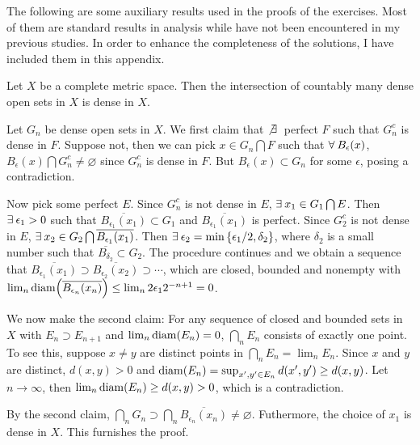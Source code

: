 The following are some auxiliary results used in the proofs 
of the exercises. Most of them are standard results in 
analysis while have not been encountered in my previous 
studies. In order to enhance the completeness of the 
solutions, I have included them in this appendix.
\begin{theorem}
    Let $X$ be a complete metric space. Then the 
    intersection of countably many dense open sets in $X$ 
    is dense in $X$.
\end{theorem}
\begin{pf}
    Let $G_n$ be dense open sets in $X$. We first claim 
    that $\not\exists\:$ perfect $F$ such that $G_n^c$ is 
    dense in $F$. Suppose not, then we can pick $x\in 
    G_n\bigcap F$ such that $\forall\: B_\epsilon(x)$, 
    $B_\epsilon(x)\bigcap G_n^c\neq\varnothing$ since 
    $G_n^c$ is dense in $F$. But $B_\epsilon(x)\subset
    G_n$ for some $\epsilon$, posing a contradiction.

    Now pick some perfect $E$. Since $G_n^c$ is not dense 
    in $E$, $\exists\: x_1\in G_1\bigcap E$. Then $\exists\:
    \epsilon_1>0$ such that 
    $\overline{B_{\epsilon_1}(x_1)}\subset G_1$ and 
    $\overline{B_{\epsilon_1}(x_1)}$ is perfect. Since 
    $G_2^c$ is not dense in $E$, $\exists\: x_2\in G_2\bigcap
    \overline{B_{\epsilon_1}(x_1)}$. Then $\exists\:
    \epsilon_2 = \min\left\{ {\epsilon_1/2,\delta_2} \right\}$, where 
    $\delta_2$ is a small number such that 
    $\overline{B_{\delta_2}}\subset G_2$. The procedure 
    continues and we obtain a sequence that 
    $\overline{B_{\epsilon_1}(x_1)}\supset
    \overline{B_{\epsilon_2}(x_2)}\supset\cdots$, which 
    are closed, bounded and nonempty with 
    $\lim_{n}\diam{\overline{B_{\epsilon_n}(x_n)}}
    \leq \lim_{n} 2\epsilon_1 2^{-n+1} = 0$. 

    We now make the second claim: For any sequence of 
    closed and bounded sets in $X$ with 
    $E_n\supset E_{n+1}$ and $\lim_{n}\diam{E_n}=0$, 
    $\bigcap_n E_n$ consists of exactly one point. To see 
    this, suppose $x\neq y$ are distinct points in 
    $\bigcap_n E_n = \lim_{n}E_n$. Since $x$ and $y$ are 
    distinct, $d(x,y)>0$ and $\diam{E_n} = 
    \sup_{x',y'\in E_n} d(x',y')\geq d(x,y)$. Let 
    $n\to\infty$, then $\lim_{n}\diam{E_n}\geq d(x,y)>0$, 
    which is a contradiction.

    By the second claim, $\bigcap_n G_n\supset
    \bigcap_n\overline{B_{\epsilon_n}(x_n)}
    \neq\varnothing$. Futhermore, the choice of $x_1$ is 
    dense in $X$. This furnishes the proof.
\end{pf}

